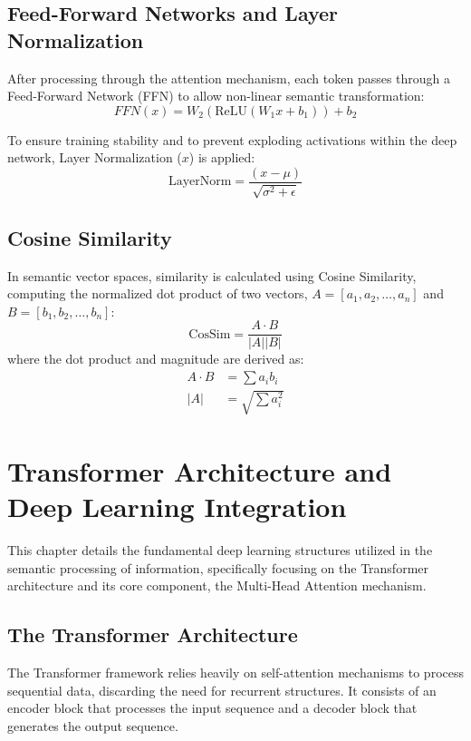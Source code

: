\documentclass[10pt, conference]{IEEEtran}
\begin{document}
\subsection{\textbf{Feed-Forward Networks and Layer Normalization}}
After processing through the attention mechanism, each token passes through a Feed-Forward Network (FFN) to allow non-linear semantic transformation:
\begin{equation}
    FFN(x) = W_2(\text{ReLU}(W_1 x + b_1)) + b_2
\end{equation}

To ensure training stability and to prevent exploding activations within the deep network, Layer Normalization ($x$) is applied:
\begin{equation}
    \text{LayerNorm} = \frac{(x - \mu)}{\sqrt{\sigma^2 + \epsilon}}
\end{equation}

\subsection{\textbf{Cosine Similarity}}
In semantic vector spaces, similarity is calculated using Cosine Similarity, computing the normalized dot product of two vectors, $A = [a_1, a_2, \dots, a_n]$ and $B = [b_1, b_2, \dots, b_n]$:
\begin{equation}
    \text{CosSim} = \frac{A \cdot B}{|A||B|}
\end{equation}
where the dot product and magnitude are derived as:
\begin{align}
    A \cdot B &= \sum a_i b_i \\
    |A| &= \sqrt{\sum a_i^2}
\end{align}

\section{\large \textbf{Transformer Architecture and Deep Learning Integration}}

This chapter details the fundamental deep learning structures utilized in the semantic processing of information, specifically focusing on the Transformer architecture and its core component, the Multi-Head Attention mechanism.

\subsection{\textbf{The Transformer Architecture}}
The Transformer framework relies heavily on self-attention mechanisms to process sequential data, discarding the need for recurrent structures. It consists of an encoder block that processes the input sequence and a decoder block that generates the output sequence.
\end{document}
